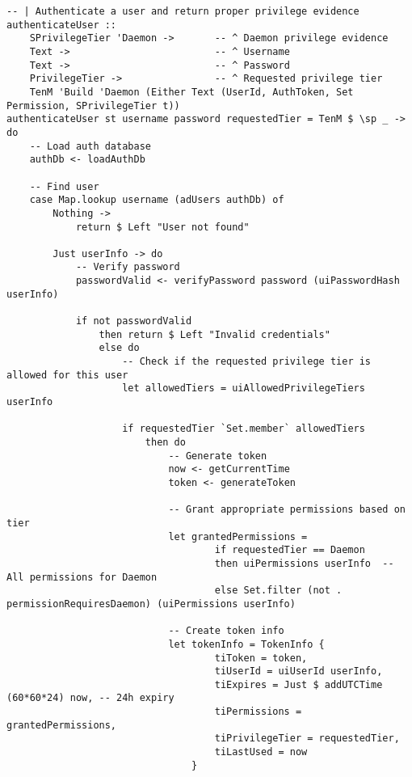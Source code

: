 \documentclass{article}
\begin{document}
\begin{tcolorbox}[title=Ten/Daemon/Auth.hs Changes]
\begin{verbatim}
-- | Authenticate a user and return proper privilege evidence
authenticateUser ::
    SPrivilegeTier 'Daemon ->       -- ^ Daemon privilege evidence
    Text ->                         -- ^ Username
    Text ->                         -- ^ Password
    PrivilegeTier ->                -- ^ Requested privilege tier
    TenM 'Build 'Daemon (Either Text (UserId, AuthToken, Set Permission, SPrivilegeTier t))
authenticateUser st username password requestedTier = TenM $ \sp _ -> do
    -- Load auth database
    authDb <- loadAuthDb

    -- Find user
    case Map.lookup username (adUsers authDb) of
        Nothing ->
            return $ Left "User not found"

        Just userInfo -> do
            -- Verify password
            passwordValid <- verifyPassword password (uiPasswordHash userInfo)

            if not passwordValid
                then return $ Left "Invalid credentials"
                else do
                    -- Check if the requested privilege tier is allowed for this user
                    let allowedTiers = uiAllowedPrivilegeTiers userInfo

                    if requestedTier `Set.member` allowedTiers
                        then do
                            -- Generate token
                            now <- getCurrentTime
                            token <- generateToken

                            -- Grant appropriate permissions based on tier
                            let grantedPermissions =
                                    if requestedTier == Daemon
                                    then uiPermissions userInfo  -- All permissions for Daemon
                                    else Set.filter (not . permissionRequiresDaemon) (uiPermissions userInfo)

                            -- Create token info
                            let tokenInfo = TokenInfo {
                                    tiToken = token,
                                    tiUserId = uiUserId userInfo,
                                    tiExpires = Just $ addUTCTime (60*60*24) now, -- 24h expiry
                                    tiPermissions = grantedPermissions,
                                    tiPrivilegeTier = requestedTier,
                                    tiLastUsed = now
                                }


\end{verbatim}
\end{tcolorbox}
\end{document}
